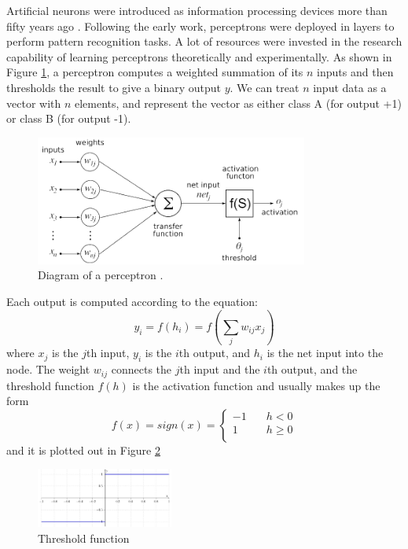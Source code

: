 Artificial neurons were introduced as information processing devices more than fifty years ago \citep{mcculloch1943logical}. Following the early work, perceptrons were deployed in layers to perform pattern recognition tasks. A lot of resources were invested in the research capability of learning perceptrons theoretically and experimentally. As shown in Figure \ref{fig:perceptron}, a perceptron computes a weighted summation of its $n$ inputs and then thresholds the result to give a binary output $y$. We can treat $n$ input data as a vector with $n$ elements, and represent the vector as either class A (for output +1) or class B (for output -1).
\graphicspath{ {./Figures/} }
\begin{figure}[!htb]
\centering
\includegraphics[width=0.8\textwidth]{Figure2-1.png}
\caption{\label{fig:perceptron}Diagram of a perceptron \citep{NeuronFigure1}.}
\end{figure}

Each output is computed according to the equation:
\begin{equation}\label{eq:BasicEq}
y_{i} = f(h_{i}) = f\left(\sum_{j}w_{ij}x_{j}\right)
\end{equation}
where $x_{j}$ is the $j$th input, $y_{i}$ is the $i$th output, and $h_{i}$ is the net input into the node. The weight $w_{ij}$ connects the $j$th input and the $i$th output, and the threshold function $f(h)$ is the activation function and usually makes up the form
\begin{equation}\label{eq:FullEq}
f(x) = sign(x) = 
  \begin{cases}
    -1       & \quad h < 0 \\
    1  & \quad h \geq 0\\
  \end{cases}
\end{equation}
and it is plotted out in Figure \ref{fig:ThresholdFunc}
\graphicspath{ {./Figures/} }
\begin{figure}[!htb]
\centering
\includegraphics[width=0.4\textwidth]{ThresholdFunc.jpeg}
\caption{\label{fig:ThresholdFunc}Threshold function}
\end{figure}

